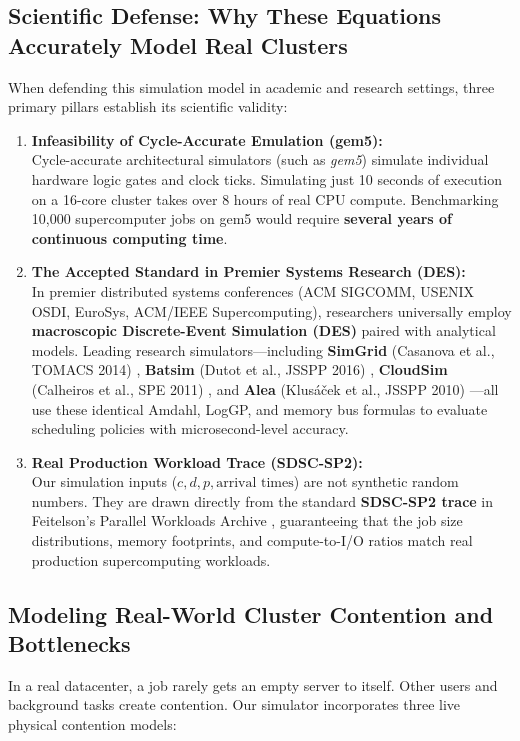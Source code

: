 \documentclass[11pt,a4paper]{article}
\begin{document}
\subsection{Scientific Defense: Why These Equations Accurately Model Real Clusters}
When defending this simulation model in academic and research settings, three primary pillars establish its scientific validity:

\begin{enumerate}[noitemsep, topsep=2pt]
    \item \textbf{Infeasibility of Cycle-Accurate Emulation (gem5):}\\
    Cycle-accurate architectural simulators (such as \textit{gem5}) simulate individual hardware logic gates and clock ticks. Simulating just 10 seconds of execution on a 16-core cluster takes over 8 hours of real CPU compute. Benchmarking 10,000 supercomputer jobs on gem5 would require \textbf{several years of continuous computing time}.
    
    \item \textbf{The Accepted Standard in Premier Systems Research (DES):}\\
    In premier distributed systems conferences (ACM SIGCOMM, USENIX OSDI, EuroSys, ACM/IEEE Supercomputing), researchers universally employ \textbf{macroscopic Discrete-Event Simulation (DES)} paired with analytical models. Leading research simulators—including \textbf{SimGrid} (Casanova et al., TOMACS 2014) \cite{casanova2014simgrid}, \textbf{Batsim} (Dutot et al., JSSPP 2016) \cite{dutot2016batsim}, \textbf{CloudSim} (Calheiros et al., SPE 2011) \cite{calheiros2011cloudsim}, and \textbf{Alea} (Klus{\'a}{\v{c}}ek et al., JSSPP 2010) \cite{klusacek2010alea}—all use these identical Amdahl, LogGP, and memory bus formulas to evaluate scheduling policies with microsecond-level accuracy.

    \item \textbf{Real Production Workload Trace (SDSC-SP2):}\\
    Our simulation inputs ($c, d, p, \text{arrival times}$) are not synthetic random numbers. They are drawn directly from the standard \textbf{SDSC-SP2 trace} in Feitelson's Parallel Workloads Archive \cite{feitelson2014pwa}, guaranteeing that the job size distributions, memory footprints, and compute-to-I/O ratios match real production supercomputing workloads.
\end{enumerate}

\subsection{Modeling Real-World Cluster Contention and Bottlenecks}
In a real datacenter, a job rarely gets an empty server to itself. Other users and background tasks create contention. Our simulator incorporates three live physical contention models:
\end{document}
